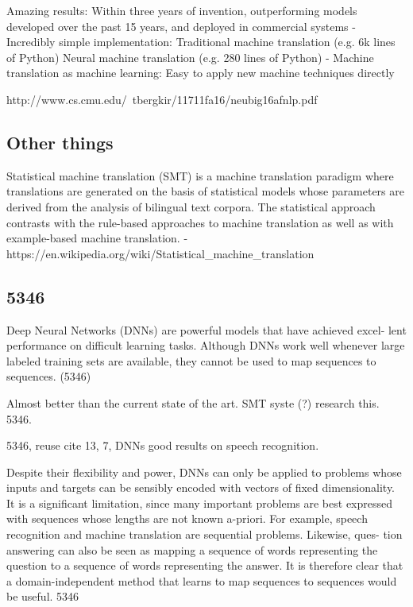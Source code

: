 Amazing results:
Within three years of invention, outperforming models
developed over the past 15 years, and deployed in
commercial systems
- Incredibly simple implementation:
Traditional machine translation (e.g. 6k lines of Python)
Neural machine translation (e.g. 280 lines of Python)
- Machine translation as machine learning:
Easy to apply new machine techniques directly

http://www.cs.cmu.edu/~tbergkir/11711fa16/neubig16afnlp.pdf

\subsection{Other things}
Statistical machine translation (SMT) is a machine translation paradigm where translations are generated on the basis of statistical models whose parameters are derived from the analysis of bilingual text corpora. The statistical approach contrasts with the rule-based approaches to machine translation as well as with example-based machine translation. - https://en.wikipedia.org/wiki/Statistical\_machine\_translation



\subsection{5346}
Deep Neural Networks (DNNs) are powerful models that have achieved excel- lent performance on difficult learning tasks. Although DNNs work well whenever large labeled training sets are available, they cannot be used to map sequences to sequences. (5346)

Almost better than the current state of the art. SMT syste (?) research this. 5346.

5346, reuse cite 13, 7, DNNs good results on speech recognition.

Despite their flexibility and power, DNNs can only be applied to problems whose inputs and targets can be sensibly encoded with vectors of fixed dimensionality. It is a significant limitation, since many important problems are best expressed with sequences whose lengths are not known a-priori. For example, speech recognition and machine translation are sequential problems. Likewise, ques- tion answering can also be seen as mapping a sequence of words representing the question to a sequence of words representing the answer. It is therefore clear that a domain-independent method that learns to map sequences to sequences would be useful. 5346

